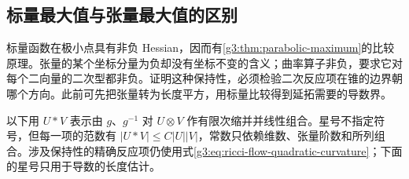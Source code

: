 \subsection{标量最大值与张量最大值的区别}
\label{g3:subsec:2703:03}
标量函数在极小点具有非负 Hessian，因而有\cref{g3:thm:parabolic-maximum}的比较原理。张量的某个坐标分量为负却没有坐标不变的含义；曲率算子非负，要求它对每个二向量的二次型都非负。证明这种保持性，必须检验二次反应项在锥的边界朝哪个方向。此前可先把张量转为长度平方，用标量比较得到延拓需要的导数界。

\ProseParagraphBreak
以下用 \(U*V\) 表示由 \(g\)、\(g^{-1}\) 对 \(U\otimes V\) 作有限次缩并并线性组合。星号不指定符号，但每一项的范数有 \(|U*V|\le C|U||V|\)，常数只依赖维数、张量阶数和所列组合。涉及保持性的精确反应项仍使用式\eqref{g3:eq:ricci-flow-quadratic-curvature}；下面的星号只用于导数的长度估计。

